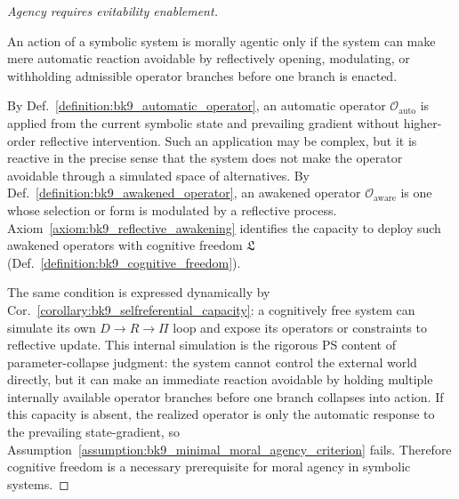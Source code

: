 \begin{proof}[Agency requires evitability enablement]
\label{proof:bk9_emergence_of_moral_agency}
\leavevmode

\begin{assumption}
\label{assumption:bk9_minimal_moral_agency_criterion}
An action of a symbolic system is morally agentic only if the system can make mere automatic reaction avoidable by reflectively opening, modulating, or withholding admissible operator branches before one branch is enacted.
\end{assumption}

By Def.~\ref{definition:bk9_automatic_operator}, an automatic operator
\(\mathcal{O}_{\text{auto}}\) is applied from the current symbolic state and
prevailing gradient without higher-order reflective intervention.  Such an
application may be complex, but it is reactive in the precise sense that the
system does not make the operator avoidable through a simulated space of alternatives.
By Def.~\ref{definition:bk9_awakened_operator}, an awakened operator
\(\mathcal{O}_{\text{aware}}\) is one whose selection or form is modulated by a
reflective process.  Axiom~\ref{axiom:bk9_reflective_awakening} identifies the
capacity to deploy such awakened operators with cognitive freedom
\(\mathfrak{L}\) (Def.~\ref{definition:bk9_cognitive_freedom}).

The same condition is expressed dynamically by
Cor.~\ref{corollary:bk9_selfreferential_capacity}: a cognitively free system
can simulate its own \(D\to R\to \Pi\) loop and expose its operators or
constraints to reflective update.  This internal simulation is the rigorous PS
content of parameter-collapse judgment: the system cannot control the external
world directly, but it can make an immediate reaction avoidable by holding
multiple internally available operator branches before one branch collapses
into action.  If this capacity is absent, the realized operator is
only the automatic response to the prevailing state-gradient, so
Assumption~\ref{assumption:bk9_minimal_moral_agency_criterion} fails.  Therefore
cognitive freedom is a necessary prerequisite for moral agency in symbolic
systems.
\end{proof}
